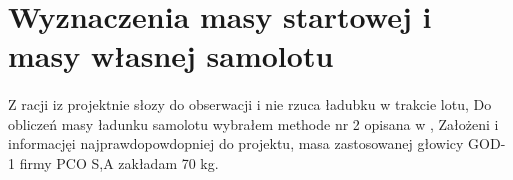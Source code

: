 \clearpage
\section{Wyznaczenia masy startowej i masy własnej samolotu}
    \paragraph{}
        Z racji iz projektnie słozy  do obserwacji i nie rzuca ładubku w trakcie lotu,
        Do obliczeń masy ładunku samolotu wybrałem methode nr 2 opisana w \cite{galinski},
        Założeni i informacjęi najprawdopowdopniej do projektu, masa zastosowanej głowicy GOD-1 firmy PCO S,A zakładam 70 kg.
        
